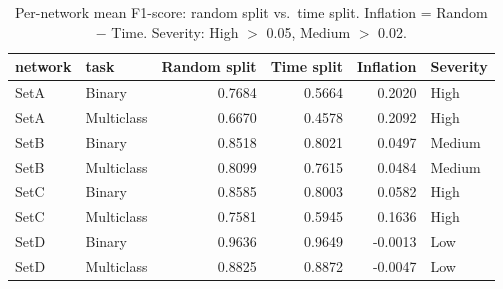 \begin{table}
\caption{Per-network mean F1-score: random split vs.\ time split. Inflation = Random $-$ Time. Severity: High $>$ 0.05, Medium $>$ 0.02.}
\label{tab:q2_per_network}
\begin{tabular}{llrrrl}
\toprule
network & task & Random split & Time split & Inflation & Severity \\
\midrule
SetA & Binary & 0.7684 & 0.5664 & 0.2020 & High \\
SetA & Multiclass & 0.6670 & 0.4578 & 0.2092 & High \\
SetB & Binary & 0.8518 & 0.8021 & 0.0497 & Medium \\
SetB & Multiclass & 0.8099 & 0.7615 & 0.0484 & Medium \\
SetC & Binary & 0.8585 & 0.8003 & 0.0582 & High \\
SetC & Multiclass & 0.7581 & 0.5945 & 0.1636 & High \\
SetD & Binary & 0.9636 & 0.9649 & -0.0013 & Low \\
SetD & Multiclass & 0.8825 & 0.8872 & -0.0047 & Low \\
\bottomrule
\end{tabular}
\end{table}
